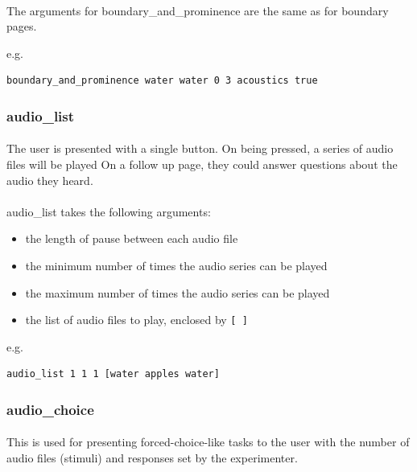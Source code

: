 \documentclass[12pt, oneside]{scrbook}   	%
\begin{document}
\paragraph{}
The arguments for boundary\_and\_prominence are the same as for boundary pages.

e.g.
\begin{lstlisting}
boundary_and_prominence water water 0 3 acoustics true
\end{lstlisting}

\subsubsection{audio\_list}

\paragraph{}
The user is presented with a single button.  On being pressed, a series of audio files will be played  On a follow up page, they could answer questions about the audio they heard.

\paragraph{}
audio\_list takes the following arguments:

\begin{itemize}
\item the length of pause between each audio file
\item the minimum number of times the audio series can be played
\item the maximum number of times the audio series can be played
\item the list of audio files to play, enclosed by \texttt{[ ]}
\end{itemize}

e.g.
\begin{lstlisting}
audio_list 1 1 1 [water apples water]
\end{lstlisting}

\subsubsection{audio\_choice}

\paragraph{}
This is used for presenting forced-choice-like tasks to the user with the number of audio files (stimuli) and responses set by the experimenter.
\end{document}
